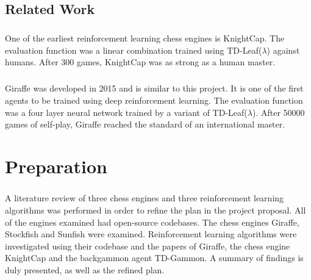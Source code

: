 \documentclass[12pt,a4paper]{book}
\begin{document}
\section{Related Work}

\paragraph{} One of the earliest reinforcement learning chess engines is KnightCap. The evaluation function was a linear combination trained using TD-Leaf($\lambda$) against humans. After 300 games, KnightCap was as strong as a human master. \cite{knightcap}

\paragraph{} Giraffe was developed in 2015 and is similar to this project. It is one of the first agents to be trained using deep reinforcement learning. The evaluation function was a four layer neural network trained by a variant of TD-Leaf($\lambda$). After 50000 games of self-play, Giraffe reached the standard of an international master. \cite{giraffe}

\chapter{Preparation}

\paragraph{} A literature review of three chess engines and three reinforcement learning algorithms was performed in order to refine the plan in the project proposal. All of the engines examined had open-source codebases. The chess engines Giraffe, Stockfish and Sunfish were examined. Reinforcement learning algorithms were investigated using their codebase and the papers of Giraffe, the chess engine KnightCap and the backgammon agent TD-Gammon. A summary of findings is duly presented, as well as the refined plan.

\end{document}
